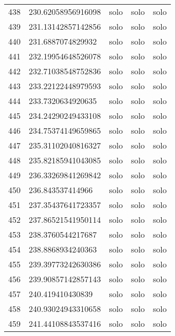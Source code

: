 \begin{table}[]
\begin{tabular}{lllll}
    438  & 230.62058956916098 & solo         & solo            & solo           \\
    439  & 231.13142857142856 & solo         & solo            & solo           \\
    440  & 231.6887074829932  & solo         & solo            & solo           \\
    441  & 232.19954648526078 & solo         & solo            & solo           \\
    442  & 232.71038548752836 & solo         & solo            & solo           \\
    443  & 233.22122448979593 & solo         & solo            & solo           \\
    444  & 233.7320634920635  & solo         & solo            & solo           \\
    445  & 234.24290249433108 & solo         & solo            & solo           \\
    446  & 234.75374149659865 & solo         & solo            & solo           \\
    447  & 235.31102040816327 & solo         & solo            & solo           \\
    448  & 235.82185941043085 & solo         & solo            & solo           \\
    449  & 236.33269841269842 & solo         & solo            & solo           \\
    450  & 236.843537414966   & solo         & solo            & solo           \\
    451  & 237.35437641723357 & solo         & solo            & solo           \\
    452  & 237.86521541950114 & solo         & solo            & solo           \\
    453  & 238.3760544217687  & solo         & solo            & solo           \\
    454  & 238.8868934240363  & solo         & solo            & solo           \\
    455  & 239.39773242630386 & solo         & solo            & solo           \\
    456  & 239.90857142857143 & solo         & solo            & solo           \\
    457  & 240.419410430839   & solo         & solo            & solo           \\
    458  & 240.93024943310658 & solo         & solo            & solo           \\
    459  & 241.44108843537416 & solo         & solo            & solo           \\

\end{tabular}
\end{table}
